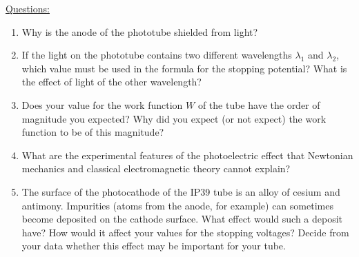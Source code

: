 \underline{Questions:}
\begin{enumerate}
\item Why is the anode of the phototube shielded from light?

\item If the light on the phototube contains two different wavelengths $\lambda_{1}$ and $\lambda_{2}$, which value must be used in the formula for the stopping potential? What is the effect of light of the other wavelength?

\item Does your value for the work function $W$ of the tube have the order of magnitude you expected? Why did you expect (or not expect) the work function to be of this magnitude?

\item What are the experimental features of the photoelectric effect that Newtonian mechanics and classical electromagnetic theory cannot explain? 

\item The surface of the photocathode of the IP39 tube is an alloy of cesium and antimony. Impurities (atoms from the anode, for example) can sometimes become deposited on the cathode surface. What effect would such a deposit have? How would it affect your values for the stopping voltages? Decide from your data whether this effect may be important for your tube.
\end{enumerate}
